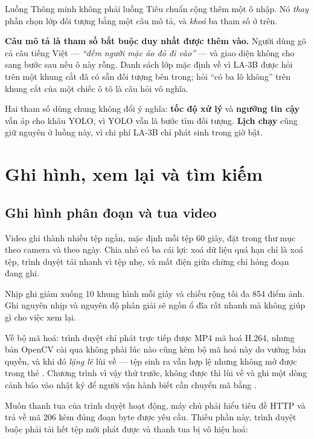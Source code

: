 Luồng Thông minh không phải luồng Tiêu chuẩn cộng thêm một ô nhập. Nó \emph{thay} phần
chọn lớp đối tượng bằng một câu mô tả, và \emph{khoá} ba tham số ở trên.

\textbf{Câu mô tả là tham số bắt buộc duy nhất được thêm vào.} Người dùng gõ cả câu
tiếng Việt --- \emph{``đếm người mặc áo đỏ đi vào''} --- và giao diện không cho sang
bước sau nếu ô này rỗng. Danh sách lớp mặc định về  vì LA-3B được hỏi trên
một khung cắt đã có sẵn đối tượng bên trong; hỏi ``có ba lô không'' trên khung cắt của
một chiếc ô tô là câu hỏi vô nghĩa.


Hai tham số dùng chung không đổi ý nghĩa: \textbf{tốc độ xử lý} và \textbf{ngưỡng tin
cậy} vẫn áp cho khâu YOLO, vì YOLO vẫn là bước tìm đối tượng. \textbf{Lịch chạy} cũng
giữ nguyên ở luồng này, vì chi phí LA-3B chỉ phát sinh trong giờ
bật.



\section{Ghi hình, xem lại và tìm kiếm}
\label{sec:ghihinh}

\subsection{Ghi hình phân đoạn và tua video}

Video ghi thành nhiều tệp ngắn, mặc định mỗi tệp 60 giây, đặt trong thư mục theo
camera và theo ngày. Chia nhỏ có ba cái lợi: xoá dữ liệu quá hạn chỉ là xoá tệp,
trình duyệt tải nhanh vì tệp nhẹ, và mất điện giữa chừng chỉ hỏng đoạn đang ghi.

Nhịp ghi giảm xuống 10 khung hình mỗi giây và chiều rộng tối đa 854 điểm ảnh.
Ghi nguyên nhịp và nguyên độ phân giải sẽ ngốn ổ đĩa rất nhanh mà không giúp gì
cho việc xem lại.

Về bộ mã hoá: trình duyệt chỉ phát trực tiếp được MP4 mã hoá H.264, nhưng bản OpenCV
cài qua  không phải lúc nào cũng kèm bộ mã hoá này do vướng bản quyền, và
 khi đó \emph{lặng lẽ} lùi về  --- tệp sinh ra vẫn hợp lệ
nhưng không mở được trong thẻ . Chương trình vì vậy thử 
trước, không được thì lùi về  và ghi một dòng cảnh báo vào nhật ký để người
vận hành biết cần chuyển mã bằng .

Muốn thanh tua của trình duyệt hoạt động, máy chủ phải hiểu tiêu đề HTTP
 và trả về mã 206 kèm đúng đoạn byte được yêu cầu. Thiếu phần này,
trình duyệt buộc phải tải hết tệp mới phát được và thanh tua bị vô hiệu hoá:

